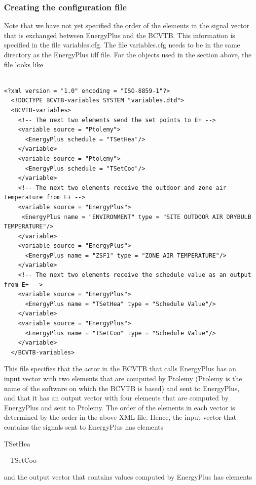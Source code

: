 \subsubsection{Creating the configuration file}\label{creating-the-configuration-file}

Note that we have not yet specified the order of the elements in the signal vector that is exchanged between EnergyPlus and the BCVTB. This information is specified in the file variables.cfg. The file variables.cfg needs to be in the same directory as the EnergyPlus idf file. For the objects used in the section above, the file looks like

\begin{lstlisting}

<?xml version = "1.0" encoding = "ISO-8859-1"?>
  <!DOCTYPE BCVTB-variables SYSTEM "variables.dtd">
  <BCVTB-variables>
    <!-- The next two elements send the set points to E+ -->
    <variable source = "Ptolemy">
      <EnergyPlus schedule = "TSetHea"/>
    </variable>
    <variable source = "Ptolemy">
      <EnergyPlus schedule = "TSetCoo"/>
    </variable>
    <!-- The next two elements receive the outdoor and zone air temperature from E+ -->
    <variable source = "EnergyPlus">
     <EnergyPlus name = "ENVIRONMENT" type = "SITE OUTDOOR AIR DRYBULB TEMPERATURE"/>
    </variable>
    <variable source = "EnergyPlus">
      <EnergyPlus name = "ZSF1" type = "ZONE AIR TEMPERATURE"/>
    </variable>
    <!-- The next two elements receive the schedule value as an output from E+ -->
    <variable source = "EnergyPlus">
      <EnergyPlus name = "TSetHea" type = "Schedule Value"/>
    </variable>
    <variable source = "EnergyPlus">
      <EnergyPlus name = "TSetCoo" type = "Schedule Value"/>
    </variable>
  </BCVTB-variables>
\end{lstlisting}

This file specifies that the actor in the BCVTB that calls EnergyPlus has an input vector with two elements that are computed by Ptolemy (Ptolemy is the name of the software on which the BCVTB is based) and sent to EnergyPlus, and that it has an output vector with four elements that are computed by EnergyPlus and sent to Ptolemy. The order of the elements in each vector is determined by the order in the above XML file. Hence, the input vector that contains the signals sent to EnergyPlus has elements

TSetHea

~ TSetCoo

and the output vector that contains values computed by EnergyPlus has elements

